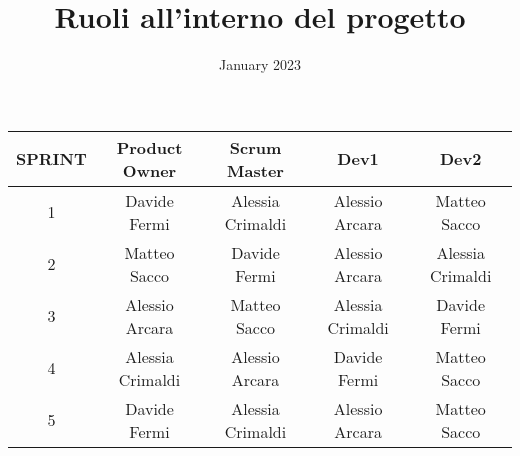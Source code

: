 \documentclass{article}
\title{Ruoli all'interno del progetto}
\date{January 2023}
\begin{document}
    \maketitle

    \begin{center}
        \begin{tabular}{ |c|c|c|c|c| }
            \hline
            SPRINT & Product Owner    & Scrum Master     & Dev1             & Dev2             \\
            \hline
            1      & Davide Fermi     & Alessia Crimaldi & Alessio Arcara   & Matteo Sacco     \\
            \hline
            2      & Matteo Sacco     & Davide Fermi     & Alessio Arcara   & Alessia Crimaldi \\
            \hline
            3      & Alessio Arcara   & Matteo Sacco   & Alessia Crimaldi   & Davide Fermi     \\
            \hline
            4      & Alessia Crimaldi & Alessio Arcara  & Davide Fermi      & Matteo Sacco   \\
            \hline
            5      & Davide Fermi     & Alessia Crimaldi & Alessio Arcara   & Matteo Sacco     \\
            \hline
        \end{tabular}
    \end{center}
\end{document}
